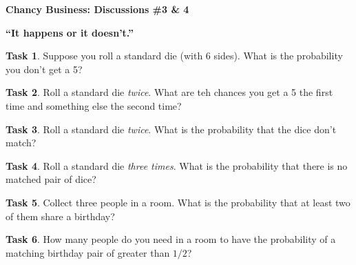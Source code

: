 \documentclass[12pt]{amsart}
\theoremstyle{definition}
\newtheorem{task}{Task}
\begin{document}
\begin{center}
\textbf{\Huge
Chancy Business: Discussions \#3 \& 4
}
\end{center}

\begin{center}\textbf{``It happens or it doesn't.''}\end{center}

\vspace{.5in}

\begin{task}
Suppose you roll a standard die (with 6 sides). What is the probability you don't get a 5?
\end{task}

\vspace{.5in}

\begin{task}
Roll a standard die \emph{twice}. What are teh chances you get a 5 the first time and something else the second time?
\end{task}

\vspace{.5in}

\begin{task}
Roll a standard die \emph{twice}. What is the probability that the dice don't match?
\end{task}

\vspace{.5in}

\begin{task}
Roll a standard die \emph{three times}. What is the probability that there is no matched pair of dice?
\end{task}

\vspace{.5in}

\begin{task}
Collect three people in a room. What is the probability that at least two of them share a birthday?
\end{task}

\vspace{.5in}

\begin{task}
How many people do you need in a room to have the probability of a matching birthday pair of greater than $1/2$?
\end{task}
\end{document}
